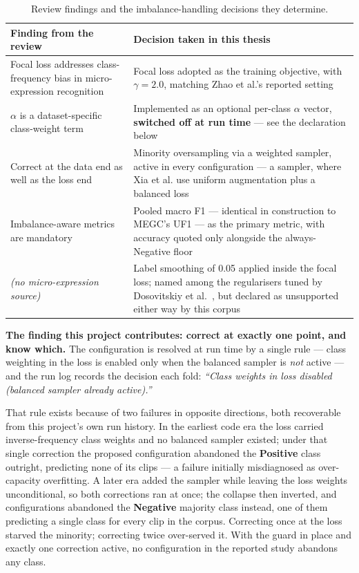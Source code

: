 \begin{table}[htbp]
	\centering
	\footnotesize
	\begin{tabular}{@{}p{5.6cm} p{8.0cm}@{}}
		\hline
		\textbf{Finding from the review} & \textbf{Decision taken in this thesis} \\
		\hline
		Focal loss addresses class-frequency bias in micro-expression recognition~\cite{zhaoS2021} & Focal loss adopted as the training objective, with \textbf{$\gamma = 2.0$}, matching Zhao et al.'s reported setting \\
		$\alpha$ is a dataset-specific class-weight term~\cite{zhaoS2021} & Implemented as an optional per-class $\alpha$ vector, \textbf{switched off at run time} --- see the declaration below \\
		Correct at the data end as well as the loss end~\cite{xia2020a} & Minority oversampling via a weighted sampler, active in every configuration --- a sampler, where Xia et al. use uniform augmentation plus a balanced loss \\
		Imbalance-aware metrics are mandatory~\cite{see2019,liong2016} & Pooled macro F1 --- identical in construction to MEGC's UF1 --- as the primary metric, with accuracy quoted only alongside the always-Negative floor \\
		\textit{(no micro-expression source)} & Label smoothing of 0.05 applied inside the focal loss; named among the regularisers tuned by Dosovitskiy et al.~\cite{dosovitskiy2021}, but declared as unsupported either way by this corpus \\
		\hline
	\end{tabular}
	\caption[Review findings and the imbalance-handling decisions they determine]{Review findings and the imbalance-handling decisions they determine.}
	\label{tab:imbalance-decisions}
\end{table}

\textbf{The finding this project contributes: correct at exactly one point, and know which.} The configuration is resolved at run time by a single rule --- class weighting in the loss is enabled only when the balanced sampler is \textit{not} active --- and the run log records the decision each fold: \textit{``Class weights in loss disabled (balanced sampler already active).''}

That rule exists because of two failures in opposite directions, both recoverable from this project's own run history. In the earliest code era the loss carried inverse-frequency class weights and no balanced sampler existed; under that single correction the proposed configuration abandoned the \textbf{Positive} class outright, predicting none of its clips --- a failure initially misdiagnosed as over-capacity overfitting. A later era added the sampler while leaving the loss weights unconditional, so both corrections ran at once; the collapse then inverted, and configurations abandoned the \textbf{Negative} majority class instead, one of them predicting a single class for every clip in the corpus. Correcting once at the loss starved the minority; correcting twice over-served it. With the guard in place and exactly one correction active, no configuration in the reported study abandons any class.

